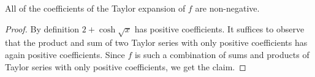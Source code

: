 \begin{lemma}
  \label{lem:taylor-nonneg}
  All of the coefficients of the Taylor expansion of $f$ are non-negative.
\end{lemma}
\begin{proof}
  By definition $2+\cosh\sqrt{x}$ has positive coefficients. It suffices to observe that the product and sum of two Taylor series with only positive coefficients has again positive coefficients. Since $f$ is such a combination of sums and products of Taylor series with only positive coefficients, we get the claim.
\end{proof}